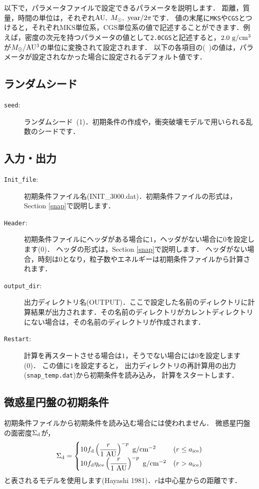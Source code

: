 \documentclass[12pt,a4paper,dvipdfmx]{jsarticle}
\begin{document}
以下で，パラメータファイルで設定できるパラメータを説明します．
距離，質量，時間の単位は，それぞれ${\rm AU},\ M_{\odot},\ {\rm year}/2\pi$です．
値の末尾に\texttt{MKS}や\texttt{CGS}とつけると，それぞれMKS単位系，CGS単位系の値で記述することができます．例えば，密度の次元を持つパラメータの値として\texttt{2.0CGS}と記述すると，$2.0\ {\rm g/cm^{3}}$が$M_{\odot}/{\rm AU^{3}}$の単位に変換されて設定されます．
以下の各項目の(\ )の値は，パラメータが設定されなかった場合に設定されるデフォルト値です．

\subsection{ランダムシード}
\begin{description}
\item[\texttt{seed}:]
ランダムシード\ (1)．初期条件の作成や，衝突破壊モデルで用いられる乱数のシードです．
\end{description}

\subsection{入力・出力}
\begin{description}
\item[\texttt{Init\_file}:]
初期条件ファイル名(INIT\_3000.dat)．初期条件ファイルの形式は，Section \ref{snap}で説明します．
\item[\texttt{Header}:]
初期条件ファイルにヘッダがある場合に$1$，ヘッダがない場合に$0$を設定します(0)．
ヘッダの形式は，Section \ref{snap}で説明します．
ヘッダがない場合，時刻は$0$となり，粒子数やエネルギーは初期条件ファイルから計算されます．
\item[\texttt{output\_dir}:]
出力ディレクトリ名(OUTPUT)．ここで設定した名前のディレクトリに計算結果が出力されます．その名前のディレクトリがカレントディレクトリにない場合は，その名前のディレクトリが作成されます．
\item[\texttt{Restart}:]
計算を再スタートさせる場合は$1$，そうでない場合には$0$を設定します(0)．
この値に$1$を設定すると，
出力ディレクトリの再計算用の出力(\texttt{snap\_temp.dat})から初期条件を読み込み，
計算をスタートします．

\end{description}

\subsection{微惑星円盤の初期条件}
初期条件ファイルから初期条件を読み込む場合には使われません．
微惑星円盤の面密度$\Sigma_{\rm d}$が，
\begin{equation}
\Sigma_{\rm d}=
\begin{cases}
10f_{\rm d}\left( \displaystyle\frac{r}{1\ {\rm AU}} \right)^{-p}\ {\rm g/cm^{-2}} & (r \leq  a_{\rm ice})\\
10f_{\rm d}\eta_{\rm ice}\left( \displaystyle\frac{r}{1\ {\rm AU}} \right)^{-p}\ {\rm g/cm^{-2}} & (r > a_{\rm ice})
\end{cases}
\label{sigmad}
\end{equation}
と表されるモデルを使用します(Hayashi 1981)．$r$は中心星からの距離です．
\end{document}
